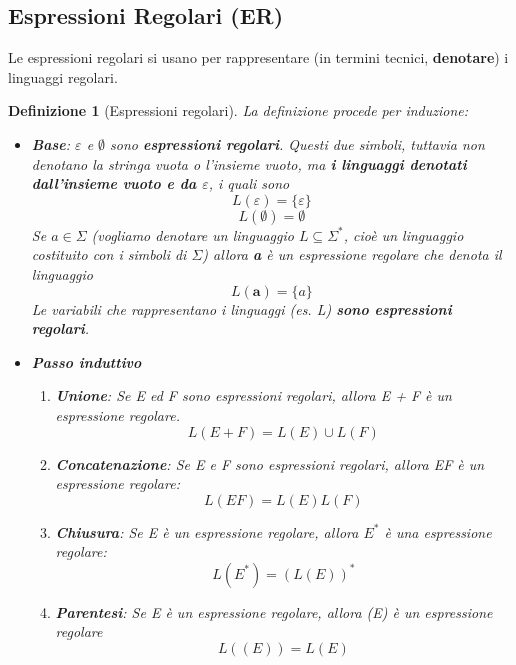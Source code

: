 \documentclass[12pt]{article}
\newtheorem{Definizione}{Definizione}[subsection]
\begin{document}
\subsection{Espressioni Regolari (ER)}
Le espressioni regolari si usano per rappresentare (in termini tecnici, \textbf{denotare}) i linguaggi regolari.
\begin{Definizione}[Espressioni regolari]
La definizione procede per induzione:
\begin{itemize}
    \item \textbf{Base}: $\varepsilon$ e $\emptyset$ sono \textbf{espressioni regolari}. Questi due simboli, tuttavia non denotano la stringa vuota o l'insieme vuoto, ma \textbf{i linguaggi denotati dall'insieme vuoto e da $\varepsilon$}, i quali sono $$L(\varepsilon) = \{\varepsilon\}$$ $$L(\emptyset) = \emptyset$$
    Se $a \in \Sigma$ (vogliamo denotare un linguaggio $L \subseteq \Sigma^*$, cioè un linguaggio costituito con i simboli di $\Sigma$) allora \textbf{a} è un espressione regolare che denota il linguaggio $$L(\textbf{a}) = \{a\}$$ 
    Le variabili che rappresentano i linguaggi (es. L) \textbf{sono espressioni regolari}.
    \item \textbf{Passo induttivo}
    \begin{enumerate}
        \item \textbf{Unione}: Se E ed F sono espressioni regolari, allora E + F è un espressione regolare. $$L(E+F) = L(E) \cup L(F)$$
        \item \textbf{Concatenazione}: Se E e F sono espressioni regolari, allora EF è un espressione regolare: $$L(EF) = L(E)L(F)$$
        \item \textbf{Chiusura}: Se E è un espressione regolare, allora $E^*$ è una espressione regolare: $$L(E^*) = (L(E))^*$$
        \item \textbf{Parentesi}: Se E è un espressione regolare, allora (E) è un espressione regolare $$L((E)) = L(E)$$
    \end{enumerate}
\end{itemize}
\end{Definizione}
\newpage
\end{document}
